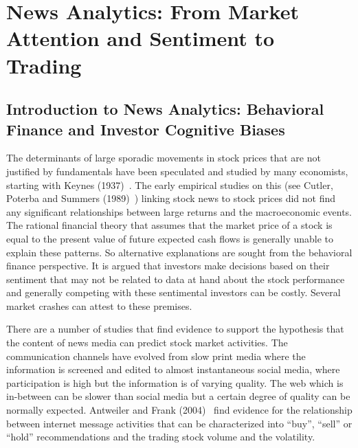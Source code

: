 \chapter{News Analytics: From Market Attention and Sentiment to Trading \label{chap:ch_news_an}}
\section{Introduction to News Analytics: Behavioral Finance and Investor Cognitive Biases}
 
 The determinants of large sporadic movements in stock prices that are not justified by fundamentals have been speculated and studied by many economists, starting with Keynes (1937)~\cite{keynes1937general}. The early empirical studies on this (see Cutler, Poterba and Summers (1989)~\cite{cutler1988moves}) linking stock news to stock prices did not find any significant relationships between large returns and the macroeconomic events. The rational financial theory that assumes that the market price of a stock is equal to the present value of future expected cash flows is generally unable to explain these patterns. So alternative explanations are sought from the behavioral finance perspective. It is argued that investors make decisions based on their sentiment that may not be related to data at hand about the stock performance and generally competing with these sentimental investors can be costly. Several market crashes can attest to these premises.
 
 
 There are a number of studies that find evidence to support the hypothesis that the content of news media can predict stock market activities. The communication channels have evolved from slow print media where the information is screened and edited to almost instantaneous social media, where participation is high but the information is of varying quality. The web which is in-between can be slower than social media but a certain degree of quality can be normally expected. Antweiler and Frank (2004)~\cite{antweiler2004all} find evidence for the relationship between internet message activities that can be characterized into ``buy'', ``sell'' or ``hold'' recommendations and the trading stock volume and the volatility.
 
